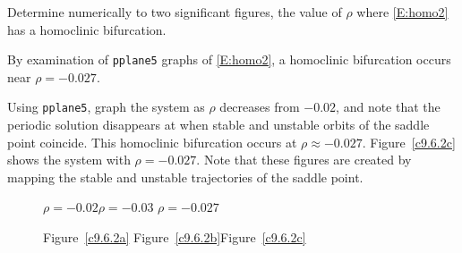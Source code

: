 \documentclass{ximera}
\begin{document}
\begin{exercise} \label{c9.6.2c}
Determine numerically to two significant figures, the value of $\rho$
where \eqref{E:homo2} has a homoclinic bifurcation. 

\begin{solution}

\ans By examination of {\tt pplane5} graphs of \eqref{E:homo2}, a homoclinic
bifurcation occurs near $\rho = -0.027$.

\soln 
Using {\tt pplane5}, graph the system as $\rho$ decreases from $-0.02$, and
note that the periodic solution disappears at when stable and unstable
orbits of the saddle point coincide.  This homoclinic bifurcation occurs
at $\rho \approx -0.027$.  Figure~\ref{c9.6.2c} shows the system with
$\rho = -0.027$.  Note that these figures are created by mapping the stable
and unstable trajectories of the saddle point.

\begin{figure}[htb]
                       \centerline{%
                       }
		\centerline{$\rho = -0.02$\hspace{1.1in}$\rho = -0.03$
\hspace{1.1in}$\rho = -0.027$}
		\centerline{Figure~\ref{c9.6.2a}\hspace{1.2in}
Figure~\ref{c9.6.2b}\hspace{1.2in}Figure~\ref{c9.6.2c}}
\end{figure}

\end{solution}
\end{exercise} 
\end{document}
